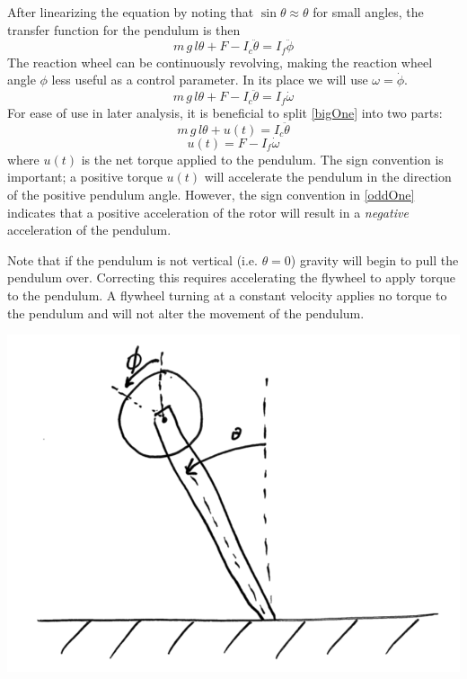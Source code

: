 \documentclass[12pt,letterpaper]{article}
\begin{document}
After linearizing the equation by noting that $\sin{\theta} \approx \theta$ for small angles, 
the transfer function for the pendulum is then
%
\begin{equation}
    m \,g \,l \theta + F - I_{c}\ddot{\theta}  = I_{f}\ddot{\phi}
\end{equation}
%
The reaction wheel can be continuously revolving, making the reaction wheel angle $\phi$ less useful as a control parameter.
In its place we will use $\omega = \dot{\phi}$.
%
\begin{equation}
    m \,g \,l \theta + F - I_{c}\ddot{\theta}  = I_{f}\dot{\omega}\label{bigOne}
\end{equation}
%
For ease of use in later analysis, it is beneficial to split \eqref{bigOne} into two parts:
%
\begin{equation}
    m \,g \,l \theta + u(t)   = I_{c}\ddot{\theta}\label{eq.pendulum}
\end{equation}
%
\begin{equation}
    u(t) = F - I_{f}\dot{\omega}\label{eq.oddOne}
\end{equation}
%
where $u(t)$ is the net torque applied to the pendulum.  The sign convention is important; a positive torque $u(t)$
will accelerate the pendulum in the direction of the positive pendulum angle.  However, the sign convention in 
\eqref{oddOne} indicates that  a positive acceleration of the rotor will result in a \textit{negative} acceleration of the pendulum.

Note that if the pendulum is not vertical (i.e. $\theta = 0$) gravity will begin to pull the pendulum over.  Correcting this requires accelerating the flywheel to apply torque to the pendulum.  A flywheel turning at a constant velocity applies no torque to the pendulum and will not alter the movement of the pendulum.



\includegraphics[width=\textwidth]{images/scan1.png}
    \label{modelOfPendulum}
\end{document}
